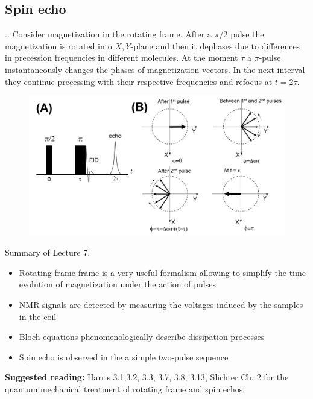 \documentclass[handout]{beamer}
\begin{document}
\subsection{Spin echo}
\begin{frame}{\thesection.\thesubsection. \insertsubsection}
  Consider magnetization in the rotating frame.  After a $\pi/2$ pulse the magnetization is rotated into $X,Y$-plane and then it dephases due to differences in precession frequencies in different molecules. At the moment $\tau$ a $\pi$-pulse instantaneously changes the phases of magnetization vectors. In the next interval they continue precessing with their respective frequencies and refocus at $t = 2 \tau$. 
  \begin{figure}
  	\centering
  	\includegraphics[scale =0.3]{figures/spin_echo.png}
  \end{figure}
\end{frame}

\begin{frame}{Summary of Lecture 7.}
    \begin{itemize}
    	\item Rotating frame frame is a very useful formalism allowing to simplify the time-evolution of magnetization under the action of pulses
    	\item NMR signals are detected by measuring the voltages induced by the samples in the coil
    	\item Bloch equations phenomenologically describe dissipation processes
    	\item Spin echo is observed in the a simple two-pulse sequence
    \end{itemize}

	\textbf{Suggested reading:} Harris 3.1,3.2, 3.3, 3.7, 3.8, 3.13, Slichter Ch. 2 for the quantum mechanical treatment of rotating frame and spin echos.
\end{frame}
\end{document}
